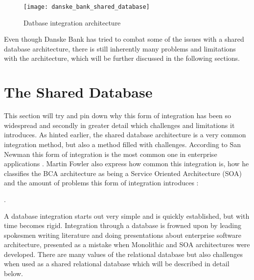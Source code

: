 \begin{figure}[!htb]
  \texttt{[image: danske\_bank\_shared\_database]}  
  \caption{Datbase integration architecture}
  \label{fig:danske_bank_shared_database}
\end{figure}


Even though Danske Bank has tried to combat some of the issues with a shared database architecture, there is still inherently many problems and limitations with the architecture, which will be further discussed in the following sections.

\section{The Shared Database}
This section will try and pin down why this form of integration has been so widespread and secondly in greater detail which challenges and limitations it introduces. As hinted earlier, the shared database architecture is a very common integration method, but also a method filled with challenges. According to San Newman this form of integration is the most common one in enterprise applications \cite[p.~41]{newman2015microservices}. Martin Fowler also express how common this integration is, how he classifies the BCA architecture as being a Service Oriented Architecture (SOA) and the amount of problems this form of integration introduces \cite[t.~09:40]{fowler2014microservicesoamonolith}:

. 

A database integration starts out very simple and is quickly established, but with time becomes rigid. Integration through a database is frowned upon by leading spokesmen writing literature and doing presentations about enterprise software architecture, presented as a mistake when Monolithic and SOA architectures were developed. There are many values of the relational database but also challenges when used as a shared relational database which will be described in detail below.

